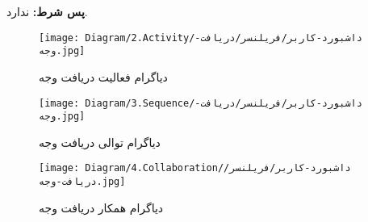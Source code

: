 \noindent
\textbf{پس شرط:}
ندارد.



\begin{figure}[H]
	\texttt{[image: Diagram/2.Activity/داشبورد-کاربر/فریلنسر/دریافت-وجه.jpg]}
	\centering
	\caption{دیاگرام فعالیت دریافت وجه}
	\label{fig:a:دریافت-وجه}
\end{figure}
\begin{figure}[H]
	\texttt{[image: Diagram/3.Sequence/داشبورد-کاربر/فریلنسر/دریافت-وجه.jpg]}
	\caption{دیاگرام توالی دریافت وجه}
	\centering
	\label{fig:s:دریافت-وجه}
\end{figure}
\begin{figure}[H]
	\texttt{[image: Diagram/4.Collaboration/داشبورد-کاربر/فریلنسر/دریافت-وجه.jpg]}
	\centering
	\caption{دیاگرام همکار دریافت وجه}
	\label{fig:c:دریافت-وجه}
\end{figure}